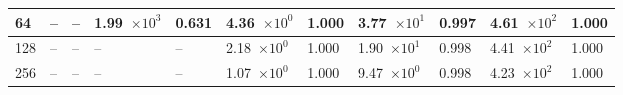 \begin{table}[!t]
\begin{center}
\begin{small}
\begin{sc}
\begin{tabular}{|l|p{1.2cm}|p{0.8cm}|p{1.2cm}|p{0.8cm}|p{1.2cm}|p{0.8cm}|p{1.2cm}|p{0.8cm}|p{1.2cm}|p{0.8cm}|}
                    \hline
                    64  & --                  & --    & 1.99~$\times10^{3}$ & 0.631 & 4.36~$\times10^{0}$ & 1.000 & 3.77~$\times10^{1}$ & 0.997  & 4.61~$\times10^{2}$ & 1.000 \\
                    \hline
                    128 & --                  & --    & --                  & --    & 2.18~$\times10^{0}$ & 1.000 & 1.90~$\times10^{1}$ & 0.998  & 4.41~$\times10^{2}$ & 1.000 \\
                    \hline
                    256 & --                  & --    & --                  & --    & 1.07~$\times10^{0}$ & 1.000 & 9.47~$\times10^{0}$ & 0.998  & 4.23~$\times10^{2}$ & 1.000 \\
                    \hline
                \end{tabular}
            \end{sc}
        \end{small}
    \end{center}
    \vskip -0.1in
\end{table}


